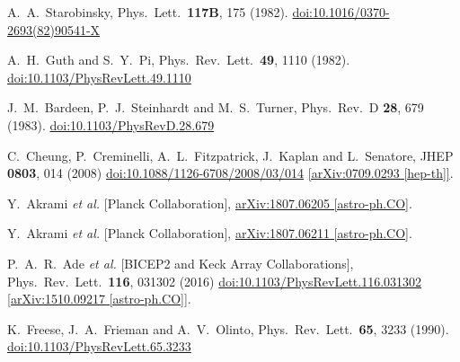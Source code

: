 \documentclass[12pt]{article}
\begin{document}
\begin{thebibliography}{99}
  A.~A.~Starobinsky,
  Phys.\ Lett.\  {\bf 117B}, 175 (1982).
  \href{https://dx.doi.org/10.1016/0370-2693(82)90541-X}{doi:10.1016/0370-2693(82)90541-X}

  A.~H.~Guth and S.~Y.~Pi,
  Phys.\ Rev.\ Lett.\  {\bf 49}, 1110 (1982).
  \href{https://dx.doi.org/10.1103/PhysRevLett.49.1110}{doi:10.1103/PhysRevLett.49.1110}

  J.~M.~Bardeen, P.~J.~Steinhardt and M.~S.~Turner,
  Phys.\ Rev.\ D {\bf 28}, 679 (1983).
  \href{https://dx.doi.org/10.1103/PhysRevD.28.679}{doi:10.1103/PhysRevD.28.679}

  C.~Cheung, P.~Creminelli, A.~L.~Fitzpatrick, J.~Kaplan and L.~Senatore,
  JHEP {\bf 0803}, 014 (2008)
  \href{https://dx.doi.org/10.1088/1126-6708/2008/03/014}{doi:10.1088/1126-6708/2008/03/014}
  \href{https://arxiv.org/abs/0709.0293}{[arXiv:0709.0293 [hep-th]]}.

  Y.~Akrami {\it et al.} [Planck Collaboration],
  \href{https://arxiv.org/abs/1807.06205}{arXiv:1807.06205 [astro-ph.CO]}.

  Y.~Akrami {\it et al.} [Planck Collaboration],
  \href{https://arxiv.org/abs/1807.06211}{arXiv:1807.06211 [astro-ph.CO]}.

  P.~A.~R.~Ade {\it et al.} [BICEP2 and Keck Array Collaborations],
  Phys.\ Rev.\ Lett.\  {\bf 116}, 031302 (2016)
  \href{https://dx.doi.org/10.1103/PhysRevLett.116.031302}{doi:10.1103/PhysRevLett.116.031302}
  \href{https://arxiv.org/abs/1510.09217}{[arXiv:1510.09217 [astro-ph.CO]]}.

  K.~Freese, J.~A.~Frieman and A.~V.~Olinto,
  Phys.\ Rev.\ Lett.\  {\bf 65}, 3233 (1990).
  \href{https://dx.doi.org/10.1103/PhysRevLett.65.3233}{doi:10.1103/PhysRevLett.65.3233}


\end{thebibliography}
\end{document}
